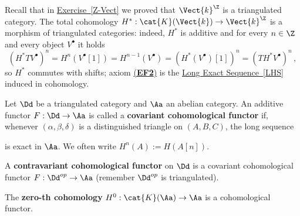 \begin{ex}
    Recall that in \hyperref[Z-Vect]{Exercise~\ref*{Z-Vect}}
    we proved that $\Vect{k}^{\Z}$ is a triangulated category.
    The total cohomology $H^* : \cat{K}(\Vect{k}) \to \Vect{k}^{\Z}$
    is a morphism of triangulated categories: indeed, 
    $H^{*}$ is additive and for every $n \in \Z$
    and every object $V^{\bullet}$ it holds
    \begin{equation*}
        (H^{*}TV^{\bullet})^{n}
        = H^{n}(V^{\bullet}[1]) 
        = H^{n-1}(V^{\bullet}) 
        = \left(H^{*}(V^{\bullet})[1]\right)^{n}
        = (TH^{*}V^{\bullet})^{n}\,,
    \end{equation*}
    so $H^{*}$ commutes with shifts; 
    axiom \hyperref[EF2]{(\textbf{EF2})}
    is the \hyperref[LHS]{Long Exact Sequence~\ref*{LHS}} induced in cohomology. 
\end{ex}

\begin{df}
    Let $\Dd$ be a triangulated category and
    $\Aa$ an abelian category.
    An additive functor $F : \Dd \to \Aa$ is called
    a \textbf{covariant cohomological functor}
    if, whenever $(\alpha, \beta, \delta)$ is a
    distinguished triangle on $(A,B,C)$,
    the long sequence
    \begin{center}
    \end{center}
    is exact in $\Aa$.
    We often write $H^{n}(A) := H(A[n])$.

    A \textbf{contravariant cohomological functor}
    on $\Dd$ is a covariant cohomological functor
    $F : \Dd^{op} \to \Aa$ (remember $\Dd^{op}$ is triangulated).
\end{df}

\begin{ex}
    The \textbf{zero-th cohomology} $H^{0} : \cat{K}(\Aa) \to \Aa$
    is a cohomological functor.
\end{ex}

